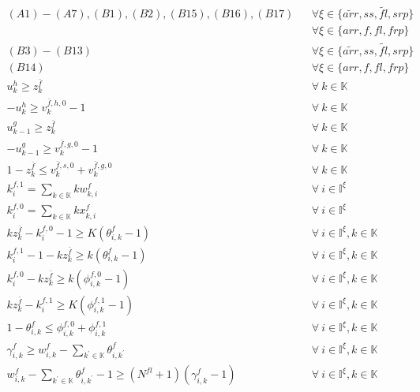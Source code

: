 \documentclass[]{interact}
\theoremstyle{plain}%
\theoremstyle{definition}
\theoremstyle{remark}
\begin{document}
\begin{eqnarray}
(A1)-(A7),(B1),(B2),(B15),(B16),(B17)&& \forall \xi \in\{\tilde{arr},ss,\tilde{fl},srp\}\nonumber\\
&&  \forall\xi \in\{arr,f,fl,frp\}\nonumber\\
(B3)-(B13)&& \forall \xi \in\{\tilde{arr},ss,\tilde{fl},srp\}\nonumber\\
(B14)&& \forall\xi \in\{arr,f,fl,frp\}\nonumber\\
u^{h}_k\ge z^{\bar{f}}_k&&\forall\ k\in \mathbb{K}\label{fail:D1}\\
-u^{h}_k\ge v^{\bar{f},h,0}_k-1&&\forall\ k\in \mathbb{K}\label{fail:D2}\\
u^{g}_{k-1}\ge z^{\bar{f}}_k &&\forall\ k\in \mathbb{K}\label{fail:D3}\\
-u^{g}_{k-1} \ge v^{\bar{f},g,0}_k-1&&\forall\ k\in \mathbb{K}\label{fail:D4}\\
1-z^{\bar{f}}_k\le v^{\bar{f},s,0}_k+v^{\bar{f},g,0}_k&&\forall\ k\in \mathbb{K}\label{fail:D5}\\
k^{f,1}_i=\sum_{k\in\mathbb{K}}kw^{f}_{k,i}&&\forall\ i\in \mathbb{I}^{\xi}\label{fail:D6}\\
k^{f,0}_i=\sum_{k\in\mathbb{K}}kx^{f}_{k,i}&&\forall\ i\in \mathbb{I}^{\xi}\label{fail:D7}\\
kz^{\bar{f}}_k -k^{f,0}_i - 1 \ge K(\theta^{f}_{i,k}-1)&&\forall\ i\in \mathbb{I}^{\xi},k\in \mathbb{K}\label{fail:D8}\\
k^{f,1}_i - 1 - kz^{\bar{f}}_k \ge k(\theta^{f}_{i,k}-1)&&\forall\  i\in \mathbb{I}^{\xi},k\in \mathbb{K}\label{fail:D9}\\
k^{f,0}_i - kz^{\bar{f}}_k \ge k(\phi^{f,0}_{i,k}-1)&&\forall\ i\in \mathbb{I}^{\xi},k\in \mathbb{K}\label{fail:D10}\\
kz^{\bar{f}}_k - k^{f,1}_i \ge K(\phi^{f,1}_{i,k}-1)&&\forall\ i\in \mathbb{I}^{\xi},k\in \mathbb{K}\label{fail:D11}\\
1-\theta^{f}_{i,k} \le \phi^{f,0}_{i,k} + \phi^{f,1}_{i,k}&&\forall\ i\in \mathbb{I}^{\xi},k\in \mathbb{K}\label{fail:D12}\\
\gamma^{f}_{i,k} \ge w^{f}_{i,k} - \sum_{k^{'}\in \mathbb{K}}\theta^{f}_{i,k^{'}}&&\forall\ i\in \mathbb{I}^{\xi},k\in \mathbb{K}\label{fail:D13}\\
w^{f}_{i,k} - \sum_{k^{'}\in \mathbb{K}}\theta^{f}_{i,k^{'}} -1 \ge (N^{fl}+1)(\gamma^{f}_{i,k}-1) &&\forall\ i\in \mathbb{I}^{\xi},k\in \mathbb{K}\label{fail:D14}
\end{eqnarray}
\end{document}

